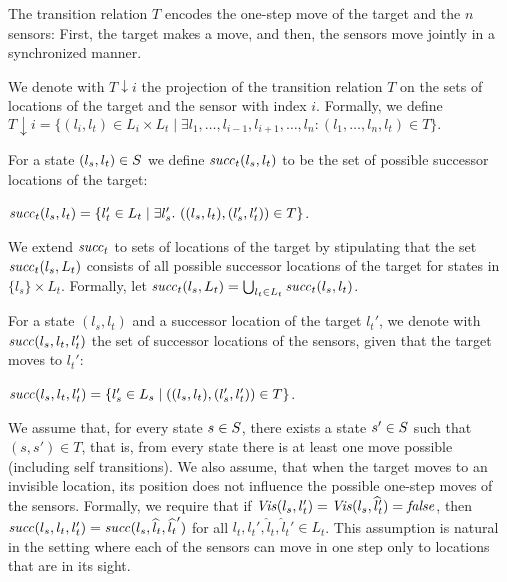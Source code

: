 The transition relation $T$ encodes the one-step move of the target and the $n$ sensors: First, the target makes a move, and then, the sensors move jointly in a synchronized manner. 

We denote with $T{\downarrow}i$ the projection of the transition relation $T$ on the sets of locations of the target and the sensor with index $i$. Formally, we define
$T{\downarrow }i = \{(l_i,l_t) \in L_i \times L_t \mid \exists l_1,\ldots,l_{i-1},l_{i+1},\ldots,l_n : (l_1,\ldots,l_n,l_t) \in T\}.$ 

For a state $(l_s,l_t) \in S$ we define $\mathit{succ}_t(l_s,l_t)$ to be the set of possible successor locations of the target:

$\mathit{succ}_t(l_s,l_{t}) = \{l_{t}' \in L_t \mid \exists l_s'.\ ((l_s,l_t),(l_s',l_t')) \in T\}$.

We extend $\mathit{succ}_t$ to sets of locations of the target by stipulating that the set $\mathit{succ}_t(l_s,L_t)$ consists of all possible successor locations of the target for states in $\{l_s\} \times L_t$. Formally, let $\mathit{succ}_t(l_s, L_t) = \bigcup_{l_t \in L_t}\mathit{succ}_t(l_s,l_t)$.

For a state $(l_s,l_t)$ and a successor location of the target $l_t'$, we denote with $\mathit{succ}(l_s,l_t,l_t')$ the set of successor locations of the sensors, given that the target moves to $l_t'$: 

$\mathit{succ}(l_s,l_t,l_t') = \{l_s' \in L_s \mid  ((l_s,l_t),(l_s',l_t')) \in T\}$.

We assume that, for every state $s\in S$, there exists a state $s' \in S$ such that $(s,s') \in T$, that is, from every state there is at least one move possible (including self transitions). We also assume, that when the target moves to an invisible location, its position does not influence the possible one-step moves of the sensors. Formally, we require that if $\mathit{Vis}(l_s,l_t') = \mathit{Vis}(l_s,{\widehat l_t}')=\mathit{false}$, then $\mathit{succ}(l_s,l_t,l_t') = \mathit{succ}(l_s,{\widehat l_t},\widehat{l_t}')$ for all $l_t,l_t',\widehat l_t,\widehat l_t' \in L_t$. This assumption is natural in the setting where each of the  sensors can move in one step only to locations that are in its sight.

